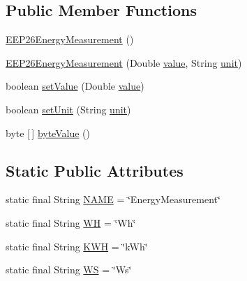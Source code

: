 \subsection*{Public Member Functions}
\begin{DoxyCompactItemize}
\item 
\hyperlink{classit_1_1polito_1_1elite_1_1enocean_1_1enj_1_1eep_1_1eep26_1_1attributes_1_1_e_e_p26_energy_measurement_af174085ad8d0b921d89fc08e98fa6e55}{E\+E\+P26\+Energy\+Measurement} ()
\item 
\hyperlink{classit_1_1polito_1_1elite_1_1enocean_1_1enj_1_1eep_1_1eep26_1_1attributes_1_1_e_e_p26_energy_measurement_a47d581cfced5c811a3cddcd11f3bbfbc}{E\+E\+P26\+Energy\+Measurement} (Double \hyperlink{classit_1_1polito_1_1elite_1_1enocean_1_1enj_1_1eep_1_1_e_e_p_attribute_af4d7e34642004bb6ccfae51e925c983d}{value}, String \hyperlink{classit_1_1polito_1_1elite_1_1enocean_1_1enj_1_1eep_1_1_e_e_p_attribute_a3fe5b3d613c30066354ad66eeb23b8ae}{unit})
\item 
boolean \hyperlink{classit_1_1polito_1_1elite_1_1enocean_1_1enj_1_1eep_1_1eep26_1_1attributes_1_1_e_e_p26_energy_measurement_af0b1eb7d9cc4c524aa9e10b9b74bae94}{set\+Value} (Double \hyperlink{classit_1_1polito_1_1elite_1_1enocean_1_1enj_1_1eep_1_1_e_e_p_attribute_af4d7e34642004bb6ccfae51e925c983d}{value})
\item 
boolean \hyperlink{classit_1_1polito_1_1elite_1_1enocean_1_1enj_1_1eep_1_1eep26_1_1attributes_1_1_e_e_p26_energy_measurement_aad09dd73502d94242dd1ca446584592f}{set\+Unit} (String \hyperlink{classit_1_1polito_1_1elite_1_1enocean_1_1enj_1_1eep_1_1_e_e_p_attribute_a3fe5b3d613c30066354ad66eeb23b8ae}{unit})
\item 
byte \mbox{[}$\,$\mbox{]} \hyperlink{classit_1_1polito_1_1elite_1_1enocean_1_1enj_1_1eep_1_1eep26_1_1attributes_1_1_e_e_p26_energy_measurement_a0091f8fd12270de6c244efe4cbcba558}{byte\+Value} ()
\end{DoxyCompactItemize}
\subsection*{Static Public Attributes}
\begin{DoxyCompactItemize}
\item 
static final String \hyperlink{classit_1_1polito_1_1elite_1_1enocean_1_1enj_1_1eep_1_1eep26_1_1attributes_1_1_e_e_p26_energy_measurement_adb0cf0140043a9999e3f8e1a29b4ac17}{N\+A\+ME} = \char`\"{}Energy\+Measurement\char`\"{}
\item 
static final String \hyperlink{classit_1_1polito_1_1elite_1_1enocean_1_1enj_1_1eep_1_1eep26_1_1attributes_1_1_e_e_p26_energy_measurement_ae73f887a5070d84b6e2f8e7d39287009}{WH} = \char`\"{}Wh\char`\"{}
\item 
static final String \hyperlink{classit_1_1polito_1_1elite_1_1enocean_1_1enj_1_1eep_1_1eep26_1_1attributes_1_1_e_e_p26_energy_measurement_a2de6ebdbf460ac7f5a4ae804af012683}{K\+WH} = \char`\"{}k\+Wh\char`\"{}
\item 
static final String \hyperlink{classit_1_1polito_1_1elite_1_1enocean_1_1enj_1_1eep_1_1eep26_1_1attributes_1_1_e_e_p26_energy_measurement_a21601ee47acce602f784736d92e2ec5e}{WS} = \char`\"{}Ws\char`\"{}
\end{DoxyCompactItemize}

